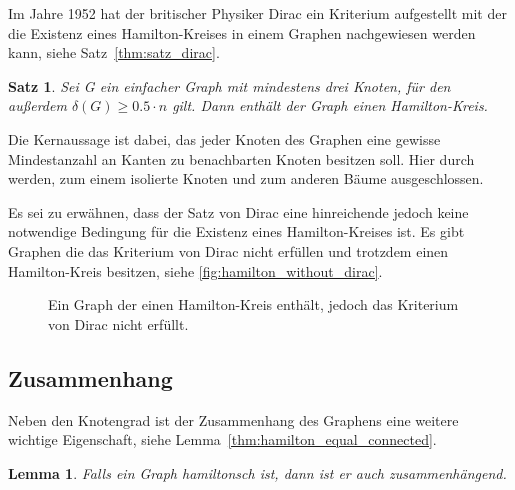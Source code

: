 \documentclass{article}
\newtheorem{mylem}{Lemma}
\newtheorem{mysat}{Satz}
\begin{document}
Im Jahre 1952 hat der britischer Physiker Dirac ein Kriterium aufgestellt mit der die Existenz eines Hamilton-Kreises in einem Graphen nachgewiesen werden kann, siehe Satz~\autoref{thm:satz_dirac}.

\begin{mysat}\label{thm:satz_dirac}
	Sei G ein einfacher Graph mit mindestens drei Knoten, für den außerdem $\delta(G)\geq 0.5\cdot n$ gilt. Dann enthält der Graph einen Hamilton-Kreis. \cite{busing2010graphen}
\end{mysat}

Die Kernaussage ist dabei, das jeder Knoten des Graphen eine gewisse Mindestanzahl an Kanten zu benachbarten Knoten besitzen soll. Hier durch werden, zum einem isolierte Knoten und zum anderen Bäume ausgeschlossen.

Es sei zu erwähnen, dass der Satz von Dirac eine hinreichende jedoch keine notwendige Bedingung für die Existenz eines Hamilton-Kreises ist. Es gibt Graphen die das Kriterium von Dirac nicht erfüllen und trotzdem einen Hamilton-Kreis besitzen, siehe \autoref{fig:hamilton_without_dirac}.

\begin{figure}[h]
	\centering
	\caption{Ein Graph der einen Hamilton-Kreis enthält, jedoch das Kriterium von Dirac nicht erfüllt.}
	\label{fig:hamilton_without_dirac}
\end{figure}


\subsection{Zusammenhang}

Neben den Knotengrad ist der Zusammenhang des Graphens eine weitere wichtige Eigenschaft, siehe Lemma~\autoref{thm:hamilton_equal_connected}.

\begin{mylem}\label{thm:hamilton_equal_connected}
	Falls ein Graph hamiltonsch ist, dann ist er auch zusammenhängend. \cite{busing2010graphen}
\end{mylem}
\end{document}
